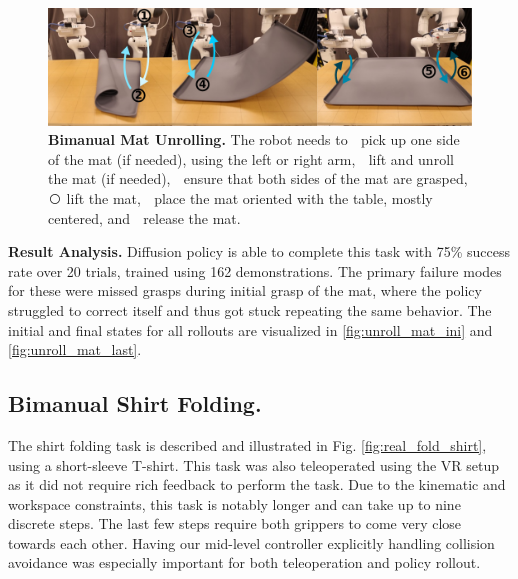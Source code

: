 \documentclass[Afour,sageh,times]{sagej}
\begin{document}
\begin{figure}[t]
\centering
\includegraphics[width=\linewidth]{figure/real_unroll_mat_setup_compressed.pdf}
\caption{\textbf{Bimanual Mat Unrolling. }
\label{fig:real_unroll_mat}
The robot needs to
\textcircled{} pick up one side of the mat (if needed), using the left or right arm,
\textcircled{} lift and unroll the mat (if needed),
\textcircled{} ensure that both sides of the mat are grasped,
\textcircled{} lift the mat,
\textcircled{} place the mat oriented with the table, mostly centered, and
\textcircled{} release the mat.
}
\vspace{-4mm}
\end{figure}

\textbf{Result Analysis.} Diffusion policy is able to complete this task with 75\% success rate over 20 trials, trained using 162 demonstrations. The primary failure modes for these were missed grasps during initial grasp of the mat, where the policy struggled to correct itself and thus got stuck repeating the same behavior. The initial and final states for all rollouts are visualized in \ref{fig:unroll_mat_ini} and \ref{fig:unroll_mat_last}.

\subsection{Bimanual Shirt Folding.}
The shirt folding task is described and illustrated in Fig. \ref{fig:real_fold_shirt}, using a short-sleeve T-shirt. This task was also teleoperated using the VR setup as it did not require rich
feedback to perform the task. Due to the kinematic and workspace constraints, this task is notably longer and can take up to nine discrete steps. The last few steps require both grippers to come very close towards each other. Having our mid-level controller explicitly handling collision avoidance was especially important for both teleoperation and policy rollout.
\end{document}
